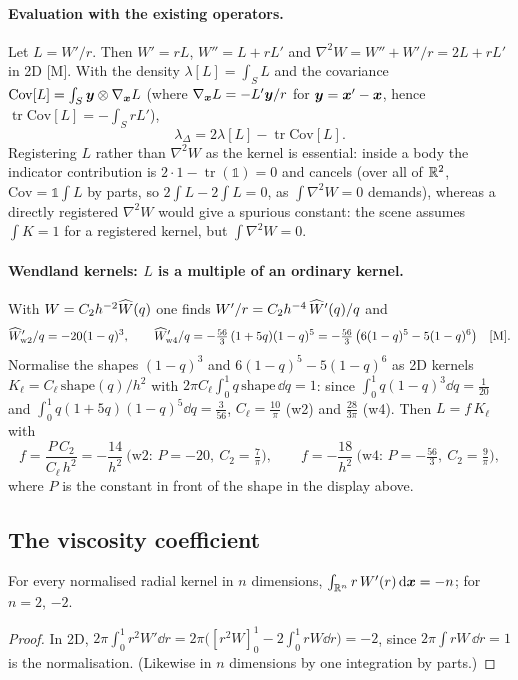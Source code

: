\paragraph{Evaluation with the existing operators.} Let $L=W'/r$. Then $W'=rL$, $W''=L+rL'$ and $\nabla^2W=W''+W'/r=2L+rL'$ in 2D [M]. With the density $\lambda[L]=\int_SL$ and
the covariance $\mathrm{Cov}[L]=\int_S\bm y\otimes\nabla_{\bm x} L$ (where $\nabla_{\bm x} L=-L'\bm y/r$ for $\bm y=\bm x'-\bm x$, hence $\operatorname{tr}\mathrm{Cov}[L]=-\int_SrL'$),
\begin{equation}\label{eq:lapscene}
 \lambda_\Delta=2\lambda[L]-\operatorname{tr}\mathrm{Cov}[L].
\end{equation}
Registering $L$ rather than $\nabla^2W$ as the kernel is essential: inside a body the indicator contribution is $2\cdot1-\operatorname{tr}(\mathbb 1)=0$ and cancels
(over all of $\mathbb{R}^2$, $\mathrm{Cov}=\mathbb 1\int L$ by parts, so $2\int L-2\int L=0$, as $\int\nabla^2W=0$ demands),
whereas a directly registered $\nabla^2W$ would give a spurious constant: the scene assumes $\int K=1$ for a registered kernel, but $\int\nabla^2W=0$.

\paragraph{Wendland kernels: $L$ is a multiple of an ordinary kernel.} With $W=C_2h^{-2}\widehat W(q)$ one finds $W'/r=C_2h^{-4}\,\widehat W'(q)/q$ and
\[
 \widehat W_{\rm w2}'/q=-20(1-q)^3,\qquad \widehat W_{\rm w4}'/q=-\tfrac{56}3\,(1+5q)(1-q)^5=-\tfrac{56}3\,\big(6(1-q)^5-5(1-q)^6\big)\quad\text{[M]}.
\]
Normalise the shapes $(1-q)^3$ and $6(1-q)^5-5(1-q)^6$ as 2D kernels $K_\ell=C_\ell\,\mathrm{shape}(q)/h^2$ with $2\pi C_\ell\int_0^1q\,\mathrm{shape}\,\dd q=1$:
since $\int_0^1q(1-q)^3\dd q=\frac1{20}$ and $\int_0^1q(1+5q)(1-q)^5\dd q=\frac3{56}$, $C_\ell=\frac{10}\pi$ (w2) and $\frac{28}{3\pi}$ (w4). Then $L=f\,K_\ell$ with
\[
 f=\frac{P\,C_2}{C_\ell\,h^2}=-\frac{14}{h^2}\ \text{(w2: }P=-20,\ C_2=\tfrac7\pi),\qquad f=-\frac{18}{h^2}\ \text{(w4: }P=-\tfrac{56}3,\ C_2=\tfrac9\pi),
\]
where $P$ is the constant in front of the shape in the display above. 

\subsection{The viscosity coefficient}
\begin{lemma}\label{lem:nu}
For every normalised radial kernel in $n$ dimensions, $\int_{\mathbb{R}^n}r\,W'(r)\,\mathrm{d}\bm x=-n$; for $n=2$, $-2$.
\end{lemma}
\begin{proof}
In 2D, $2\pi\int_0^1r^2W'\dd r=2\pi\big([r^2W]_0^1-2\int_0^1rW\dd r\big)=-2$, since $2\pi\int rW\,\dd r=1$ is the normalisation. (Likewise in $n$ dimensions by one integration by parts.) 
\end{proof}

